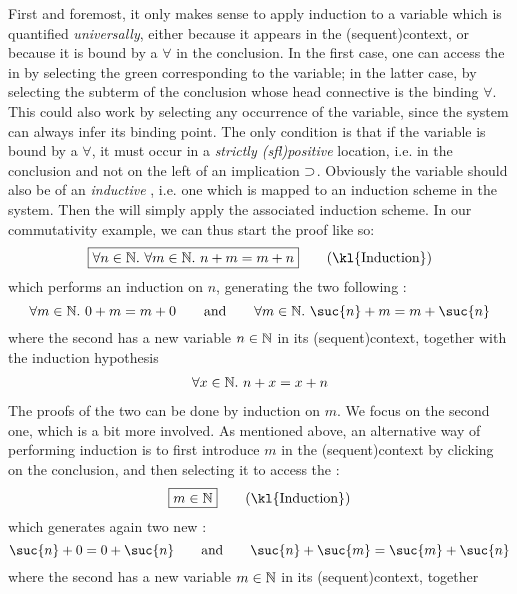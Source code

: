 First and foremost, it only makes sense to apply induction to a variable which
is quantified \emph{universally}, either because it appears in the
\kl(sequent){context}, or because it is bound by a $\forall$ in the conclusion.
In the first case, one can access the  in  by
selecting the green  corresponding to the variable; in the latter case,
by selecting the subterm of the conclusion whose head connective is the binding
$\forall$. This could also work by selecting any occurrence of
the variable, since the system can always infer its binding point. The only
condition is that if the variable is bound by a $\forall$, it must occur in a
\emph{strictly \kl(sfl){positive}} location, i.e. in the conclusion and not on
the left of an implication $\supset$. Obviously the variable should also be of an
\emph{inductive} , i.e. one which is mapped to an induction scheme in
the system. Then the
  will simply apply the associated induction scheme. In
our commutativity example, we can thus start the proof like so:
$$\select{\forall n \in \nats.\ \forall m \in \nats.\ n + m = m + n} \qquad
\text{(\kl{Induction})}$$
which performs an induction on $n$, generating the two following :
$$\forall m \in \nats.\ 0 + m = m + 0 \qquad \text{and} \qquad \forall m \in
\nats.\ \suc{n} + m = m + \suc{n}$$
where the second  has a new variable $n \in \mathbb{N}$ in its
\kl(sequent){context}, together with the induction hypothesis
\begin{gather}
  \forall x \in \mathbb{N}.\ n + x = x + n \label{hyp:::1}
\end{gather}
The proofs of the two  can be done by induction on $m$. We focus on the
second one, which is a bit more involved. As mentioned above, an alternative way
of performing induction is to first introduce $m$ in the \kl(sequent){context} by clicking on
the conclusion, and then selecting it to access the :
$$\select{m \in \nats} \qquad \text{(\kl{Induction})}$$
which generates again two new :
$$\suc{n} + 0 = 0 + \suc{n} \qquad \text{and} \qquad \suc{n} + \suc{m} = \suc{m} + \suc{n}$$ where
the second  has a new variable $m \in \mathbb{N}$ in its \kl(sequent){context}, together

